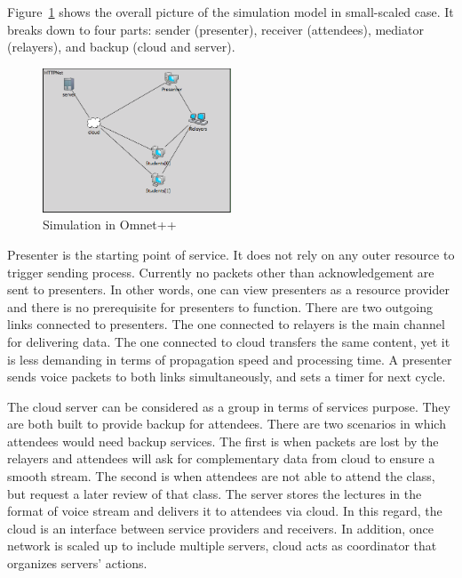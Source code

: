 
Figure~\ref{fig:sce} shows the overall picture of the simulation model in 
small-scaled case. It 
breaks down to four  parts: sender (presenter), receiver (attendees), 
mediator (relayers), and backup (cloud and server). 

\begin{figure}[h!]  
  \centering
    \includegraphics[width=0.5\textwidth]{figures/sce.png}
  \caption{Simulation in Omnet++}
  \label{fig:sce}
\end{figure}

Presenter is the starting point of service. It does not rely on any outer 
resource to trigger sending process. Currently no packets other than 
acknowledgement are sent to presenters. In other words, one can view presenters 
as a resource provider and there is no prerequisite for presenters to function. 
There are two outgoing links connected to presenters. The one connected to 
relayers is the main channel for delivering data. The one connected to cloud 
transfers the same content, yet it is less demanding in terms of propagation 
speed and processing time. A presenter sends voice packets to both links 
simultaneously, and sets a timer for next cycle. 

The cloud server can be considered as a group in terms of services 
purpose. 
They 
are both built to provide backup for attendees. There are two scenarios in 
which 
attendees would need backup services. The first is when packets are lost by the 
relayers and attendees will ask for complementary data from cloud to ensure a 
smooth stream. The second is when attendees are not able to attend 
the 
class, but request a later review of that class. The server stores the 
lectures in the format of voice stream and delivers it to attendees via cloud. 
In this regard, the cloud is an interface between service providers and 
receivers. In addition, once network is scaled up to include multiple servers, 
cloud acts as coordinator that organizes servers’ actions. 

